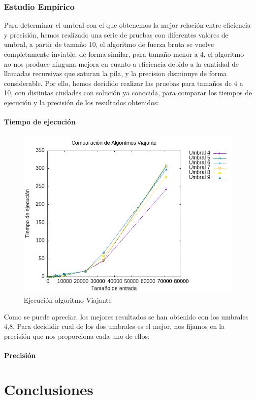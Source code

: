 \documentclass[11pt,openany]{book}
\begin{document}
\subsection{Estudio Empírico}
Para determinar el umbral con el que obtenemos la mejor relación entre eficiencia y precisión, hemos
realizado una serie de pruebas con diferentes valores de umbral, a partir de tamaño 10, el algoritmo de
fuerza bruta se vuelve completamente inviable, de forma similar, para tamaño menor a 4, el algoritmo
no nos produce ninguna mejora en cuanto a eficiencia debido a la cantidad de llamadas recursivas que
saturan la pila, y la precision disminuye de forma considerable. Por ello, hemos decidido realizar
las pruebas para tamaños de 4 a 10, con distintas ciudades con solución ya conocida, para comparar
los tiempos de ejecución y la precisión de los resultados obtenidos:
\subsubsection*{Tiempo de ejecución}
\begin{center}
      \begin{figure}[H]
            \centering
            \includegraphics[width=0.7\linewidth]{assets/Img/UmbralP3.png}
            \caption{Ejecución algoritmo Viajante}
            \label{fig:Viajante}
      \end{figure}
\end{center}
Como se puede apreciar, los mejores resultados se han obtenido con los umbrales {4,8}.
Para decididir cual de los dos umbrales es el mejor, nos fijamos en la precisión
que nos proporciona cada uno de ellos:
\subsubsection*{Precisión}



\chapter{Conclusiones}
\end{document}
